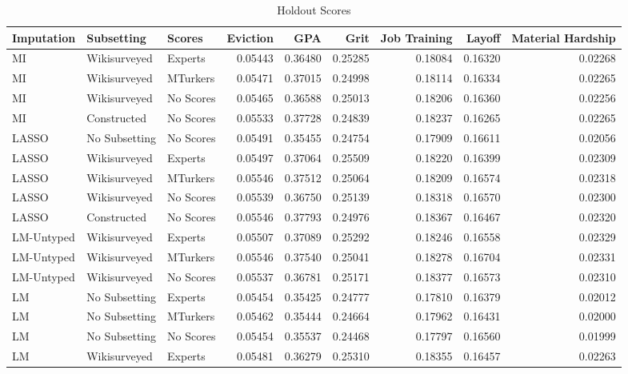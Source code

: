 \begin{table}[ht]
\scriptsize
\centering
\caption{Holdout Scores} 
\label{tab_holdout}
\begin{tabular}{lllrrrrrr}
  \toprule
Imputation & Subsetting & Scores & Eviction & GPA & Grit & Job Training & Layoff & Material Hardship \\ 
  \midrule
MI & Wikisurveyed & Experts & 0.05443 & 0.36480 & 0.25285 & 0.18084 & 0.16320 & 0.02268 \\ 
  MI & Wikisurveyed & MTurkers & 0.05471 & 0.37015 & 0.24998 & 0.18114 & 0.16334 & 0.02265 \\ 
  MI & Wikisurveyed & No Scores & 0.05465 & 0.36588 & 0.25013 & 0.18206 & 0.16360 & 0.02256 \\ 
  MI & Constructed & No Scores & 0.05533 & 0.37728 & 0.24839 & 0.18237 & 0.16265 & 0.02265 \\ 
  LASSO & No Subsetting & No Scores & 0.05491 & 0.35455 & 0.24754 & 0.17909 & 0.16611 & 0.02056 \\ 
  LASSO & Wikisurveyed & Experts & 0.05497 & 0.37064 & 0.25509 & 0.18220 & 0.16399 & 0.02309 \\ 
  LASSO & Wikisurveyed & MTurkers & 0.05546 & 0.37512 & 0.25064 & 0.18209 & 0.16574 & 0.02318 \\ 
  LASSO & Wikisurveyed & No Scores & 0.05539 & 0.36750 & 0.25139 & 0.18318 & 0.16570 & 0.02300 \\ 
  LASSO & Constructed & No Scores & 0.05546 & 0.37793 & 0.24976 & 0.18367 & 0.16467 & 0.02320 \\ 
  LM-Untyped & Wikisurveyed & Experts & 0.05507 & 0.37089 & 0.25292 & 0.18246 & 0.16558 & 0.02329 \\ 
  LM-Untyped & Wikisurveyed & MTurkers & 0.05546 & 0.37540 & 0.25041 & 0.18278 & 0.16704 & 0.02331 \\ 
  LM-Untyped & Wikisurveyed & No Scores & 0.05537 & 0.36781 & 0.25171 & 0.18377 & 0.16573 & 0.02310 \\ 
  LM & No Subsetting & Experts & 0.05454 & 0.35425 & 0.24777 & 0.17810 & 0.16379 & 0.02012 \\ 
  LM & No Subsetting & MTurkers & 0.05462 & 0.35444 & 0.24664 & 0.17962 & 0.16431 & 0.02000 \\ 
  LM & No Subsetting & No Scores & 0.05454 & 0.35537 & 0.24468 & 0.17797 & 0.16560 & 0.01999 \\ 
  LM & Wikisurveyed & Experts & 0.05481 & 0.36279 & 0.25310 & 0.18355 & 0.16457 & 0.02263 \\ 

\end{tabular}
\end{table}
